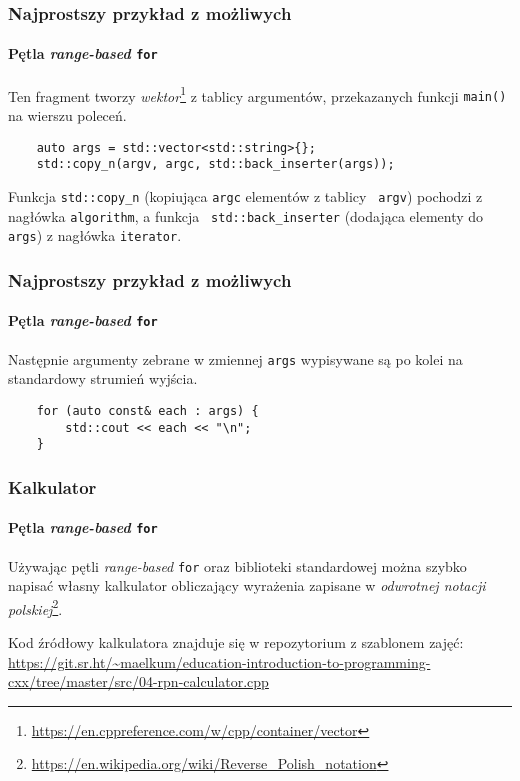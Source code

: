 \documentclass[aspectratio=169]{beamer}
\begin{document}
\begin{frame}[fragile]
    \frametitle{Najprostszy przykład z możliwych}
    \framesubtitle{Pętla \emph{range-based} {\tt for}}

    Ten fragment tworzy
    \emph{wektor}\footnote{\url{https://en.cppreference.com/w/cpp/container/vector}}
    z tablicy argumentów, przekazanych funkcji {\tt main()} na wierszu poleceń.

    {\footnotesize
    \begin{lstlisting}
    auto args = std::vector<std::string>{};
    std::copy_n(argv, argc, std::back_inserter(args));
    \end{lstlisting}}

    Funkcja {\tt std::copy\_n} (kopiująca {\tt argc} elementów z tablicy {\tt
    argv}) pochodzi z nagłówka {\tt algorithm}, a funkcja {\tt
    std::back\_inserter} (dodająca elementy do {\tt args}) z nagłówka
    {\tt iterator}.
\end{frame}

\begin{frame}[fragile]
    \frametitle{Najprostszy przykład z możliwych}
    \framesubtitle{Pętla \emph{range-based} {\tt for}}

    Następnie argumenty zebrane w zmiennej {\tt args} wypisywane są po kolei na
    standardowy strumień wyjścia.

    {\footnotesize
    \begin{lstlisting}
    for (auto const& each : args) {
        std::cout << each << "\n";
    }
    \end{lstlisting}}
\end{frame}

\begin{frame}[fragile]
    \frametitle{Kalkulator}
    \framesubtitle{Pętla \emph{range-based} {\tt for}}

    Używając pętli \emph{range-based} {\tt for} oraz biblioteki standardowej
    można szybko napisać własny kalkulator obliczający wyrażenia zapisane w
    \emph{odwrotnej notacji
    polskiej}\footnote{\url{https://en.wikipedia.org/wiki/Reverse_Polish_notation}}.

    \vspace{1em}

    {\small
    Kod źródłowy kalkulatora znajduje się w repozytorium z szablonem zajęć:
    \url{https://git.sr.ht/~maelkum/education-introduction-to-programming-cxx/tree/master/src/04-rpn-calculator.cpp}}
\end{frame}
\end{document}
